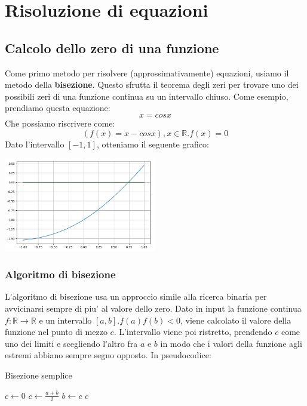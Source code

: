 \documentclass{report}
\begin{document}
\chapter{Risoluzione di equazioni}
\section{Calcolo dello zero di una funzione}
Come primo metodo per risolvere (approssimativamente) equazioni, usiamo il metodo della \textbf{bisezione}. Questo sfrutta il teorema degli zeri per trovare uno dei possibili zeri di una funzione continua su un intervallo chiuso. Come esempio, prendiamo questa equazione:
\[
x = cos x
\]
Che possiamo riscrivere come:
\[
  (f(x) = x-cos x), x \in \mathbb{R}. f(x) = 0
\]
Dato l'intervallo $ [-1, 1] $, otteniamo il seguente grafico:
\begin{center}
  \includegraphics[width=0.5\textwidth]{img/2024-09-23-12-11-58.png}
\end{center}
\subsection{Algoritmo di bisezione}
L'algoritmo di bisezione usa un approccio simile alla ricerca binaria per avvicinarsi sempre di piu' al valore dello zero. Dato in input la funzione continua $ f:\mathbb{R}\to\mathbb{R} $ e un intervallo $ [a,b]. f(a)f(b)<0 $, viene calcolato il valore della funzione nel punto di mezzo $ c $. L'intervallo viene poi ristretto, prendendo $ c $ come uno dei limiti e scegliendo l'altro fra $ a $ e $ b $ in modo che i valori della funzione agli estremi abbiano sempre segno opposto. In pseudocodice:

\begin{algorithm}[H]
\caption{Bisezione semplice}
\SetAlgoLined
\SetNoFillComment
\vspace{3mm}
$c \leftarrow 0$\;
 {
    $ c \gets \frac{a+b}{2} $\;
     {
      $ b \gets c $
    }
}
\Return $ c $
\end{algorithm}
\end{document}
